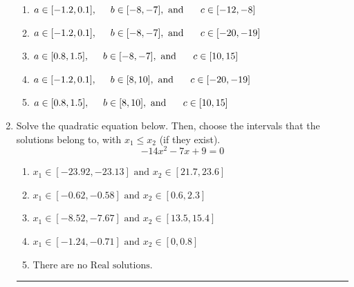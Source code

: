 \documentclass[14pt]{extbook}
\newcommand{\litem}[1]{\item#1\hspace*{-1cm}\rule{\textwidth}{0.4pt}}
\begin{document}
\begin{enumerate}
{\begin{center}
\end{center}
\begin{enumerate}[label=\Alph*.]
\item \( a \in [-1.2, 0.1], \hspace*{5mm} b \in [-8, -7], \text{ and } \hspace*{5mm} c \in [-12, -8] \)
\item \( a \in [-1.2, 0.1], \hspace*{5mm} b \in [-8, -7], \text{ and } \hspace*{5mm} c \in [-20, -19] \)
\item \( a \in [0.8, 1.5], \hspace*{5mm} b \in [-8, -7], \text{ and } \hspace*{5mm} c \in [10, 15] \)
\item \( a \in [-1.2, 0.1], \hspace*{5mm} b \in [8, 10], \text{ and } \hspace*{5mm} c \in [-20, -19] \)
\item \( a \in [0.8, 1.5], \hspace*{5mm} b \in [8, 10], \text{ and } \hspace*{5mm} c \in [10, 15] \)

\end{enumerate} }
\litem{
Solve the quadratic equation below. Then, choose the intervals that the solutions belong to, with $x_1 \leq x_2$ (if they exist).\[ -14x^{2} -7 x + 9 = 0 \]\begin{enumerate}[label=\Alph*.]
\item \( x_1 \in [-23.92, -23.13] \text{ and } x_2 \in [21.7, 23.6] \)
\item \( x_1 \in [-0.62, -0.58] \text{ and } x_2 \in [0.6, 2.3] \)
\item \( x_1 \in [-8.52, -7.67] \text{ and } x_2 \in [13.5, 15.4] \)
\item \( x_1 \in [-1.24, -0.71] \text{ and } x_2 \in [0, 0.8] \)
\item \( \text{There are no Real solutions.} \)


\end{enumerate}}
\end{enumerate}
\end{document}
